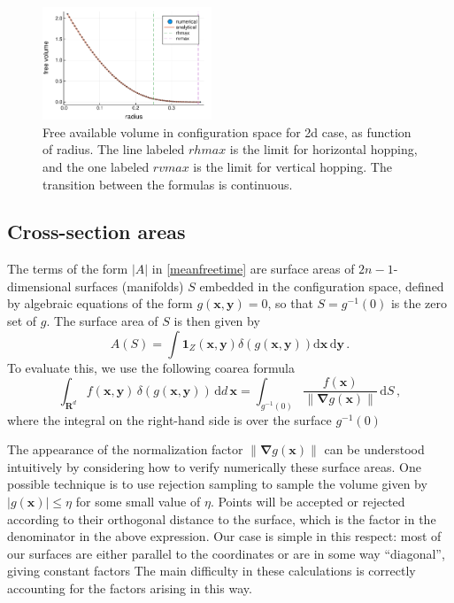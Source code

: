 \documentclass[superscriptaddress,pre,reprint,showpacs,twocolumn]{revtex4-1}
\newcommand{\rd}[1]{\mathrm{d}{#1} \,}
\newcommand{\indicatorsymbol}{\mathbf{1}}
\begin{document}
\begin{figure}[h]
\centering
\includegraphics[width=0.45\textwidth]{./figures/freevolume01.pdf}
\caption{Free available volume in configuration space for 2d case,
  as function of radius. The
  line labeled $rhmax$ is the limit for horizontal hopping, and the one labeled
  $rvmax$ is the limit for vertical hopping. The transition between the formulas
is continuous.}
\label{VolMonteC}%
\end{figure}


\subsection{Cross-section areas}\label{areahop}

The terms of the form $|A|$ in \eqref{meanfreetime} are surface areas of
$2n-1$-dimensional surfaces (manifolds) $S$ embedded in the configuration space,
defined by algebraic equations of the form $g(\mathbf{x}, \mathbf{y}) = 0$,
so that $S = g^{-1}(0)$ is the zero set of $g$.
The surface area of $S$ is then given by
\begin{equation}
  A(S) = \int \indicatorsymbol_Z(\mathbf{x ,y}) \delta(g(\mathbf{x, y}))
   \rd{\mathbf{x}} \rd{\mathbf{y}}.
\label{eq:surface-area}
\end{equation}
To evaluate this, we use the following coarea formula
\cite[section 6.1]{Hormander83} 
\begin{equation}
\int_{\mathbf{R}^d} f(\mathbf{x,y}) \, \delta(g(\mathbf{x,y})) \, \rd{d} \mathbf{x} = \int_{g^{-1}(0)}\frac{f(\mathbf{x})}{\| \mathbf{\nabla}g(\mathbf{x}) \|} \, \rd{S},
\label{eq:surface-dirac}
\end{equation}
where the integral on the right-hand side is over the surface $g^{-1}(0)$
\cite{Zappa2018}

The appearance of the normalization factor $\| \mathbf{\nabla}g(\mathbf{x}) \|$ can be understood intuitively by considering how to verify numerically these surface areas. One possible technique is to use rejection sampling to sample the volume given by $|g(\mathbf{x})| \le \eta$ for some small value of $\eta$. Points will be accepted or rejected according to their orthogonal distance to the surface, which is the factor in the denominator in the above expression. Our case is simple in this respect: most of our surfaces are either parallel to the coordinates or are in some way ``diagonal'', giving constant factors
The main difficulty in these calculations is correctly accounting for the factors arising in this way.
\end{document}
